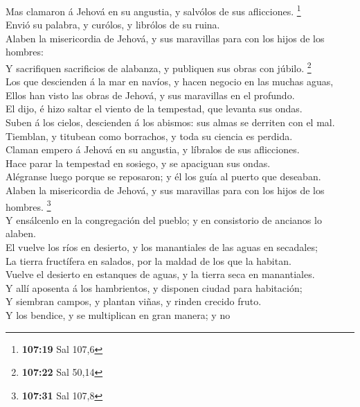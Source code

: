  Mas clamaron á Jehová en su angustia, y salvólos de sus
aflicciones. \footnote{\textbf{107:19} Sal 107,6}\\
 Envió su palabra, y curólos, y librólos de su ruina.\\
 Alaben la misericordia de Jehová, y sus maravillas para
con los hijos de los hombres:\\
 Y sacrifiquen sacrificios de alabanza, y publiquen sus
obras con júbilo. \footnote{\textbf{107:22} Sal 50,14}\\
 Los que descienden á la mar en navíos, y hacen negocio
en las muchas aguas,\\
 Ellos han visto las obras de Jehová, y sus maravillas en
el profundo.\\
 El dijo, é hizo saltar el viento de la tempestad, que
levanta sus ondas.\\
 Suben á los cielos, descienden á los abismos: sus almas
se derriten con el mal.\\
 Tiemblan, y titubean como borrachos, y toda su ciencia
es perdida.\\
 Claman empero á Jehová en su angustia, y líbralos de sus
aflicciones.\\
 Hace parar la tempestad en sosiego, y se apaciguan sus
ondas.\\
 Alégranse luego porque se reposaron; y él los guía al
puerto que deseaban.\\
 Alaben la misericordia de Jehová, y sus maravillas para
con los hijos de los hombres. \footnote{\textbf{107:31} Sal 107,8}\\
 Y ensálcenlo en la congregación del pueblo; y en
consistorio de ancianos lo alaben.\\
 El vuelve los ríos en desierto, y los manantiales de las
aguas en secadales;\\
 La tierra fructífera en salados, por la maldad de los
que la habitan.\\
 Vuelve el desierto en estanques de aguas, y la tierra
seca en manantiales.\\
 Y allí aposenta á los hambrientos, y disponen ciudad
para habitación;\\
 Y siembran campos, y plantan viñas, y rinden crecido
fruto.\\
 Y los bendice, y se multiplican en gran manera; y no
